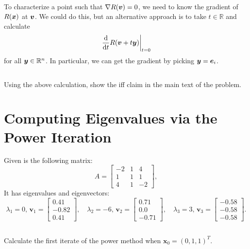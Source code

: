 \documentclass[11pt,letterpaper]{report}
\begin{document}
\subsection{}
To characterize a point such that $\nabla R(\boldsymbol{v}) = 0$, we need to know the gradient of $R(\boldsymbol{x})$ at $\boldsymbol{v}$. We could do this, but an alternative approach is to take $t\in \mathbb{R}$ and calculate
\begin{align*}
    \left.\frac{\mathrm{d}}{\mathrm{d} t} R(\boldsymbol{v}+t\boldsymbol{y})\right|_{t=0}
\end{align*}
for all $\boldsymbol{y}\in\mathbb{R}^n$. In particular, we can get the gradient by picking $\boldsymbol{y} = \boldsymbol{e}_i$.

\subsection{}
Using the above calculation, show the iff claim in the main text of the problem.

\section{Computing Eigenvalues via the Power Iteration}
Given is the following matrix:
\[
A=\begin{bmatrix}
-2 & 1 & 4  \\ 1 & 1 & 1 \\ 4 & 1 & -2 \end{bmatrix},
\]
It has eigenvalues and eigenvectors:
\[
\lambda_1=0,
\, {\boldsymbol v_1}
=\begin{bmatrix}
0.41  \\ -0.82 \\ 0.41 \end{bmatrix},\quad
\lambda_2=-6,
\,{\boldsymbol v_2}
=\begin{bmatrix}
0.71  \\ 0.0 \\ -0.71 \end{bmatrix},\quad
\lambda_3=3, \,{\boldsymbol v_3}
=\begin{bmatrix}
-0.58  \\ -0.58 \\ -0.58 \end{bmatrix}.
\]

\subsection{}\label{sec:1.a}
Calculate the first iterate of the power method when ${\boldsymbol x_0}=(0,1,1)^T$.
\end{document}
